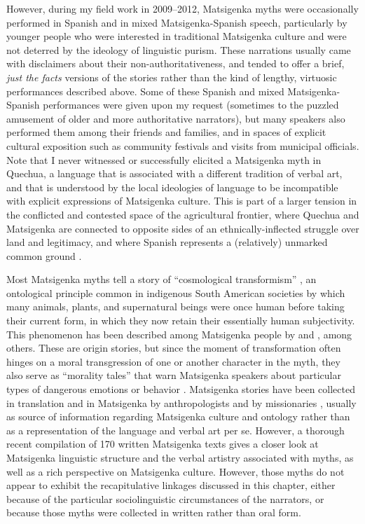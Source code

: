 \documentclass[output=paper]{LSP/langsci}
\begin{document}
However, during my field work in 2009--2012, Matsigenka myths were occasionally performed in Spanish and in mixed Matsigenka-Spanish speech, particularly by younger people who were interested in traditional Matsigenka culture and were not deterred by the ideology of linguistic purism. These narrations usually came with disclaimers about their non-authoritativeness, and tended to offer a brief, \textit{just the facts} versions of the stories rather than the kind of lengthy, virtuosic performances described above. Some of these Spanish and mixed Matsigenka-Spanish performances were given upon my request (sometimes to the puzzled amusement of older and more authoritative narrators), but many speakers also performed them among their friends and families, and in spaces of explicit cultural exposition such as community festivals and visits from municipal officials. Note that I never witnessed or successfully elicited a Matsigenka myth in Quechua, a language that is associated with a different tradition of verbal art, and that is understood by the local ideologies of language to be incompatible with explicit expressions of Matsigenka culture. This is part of a larger tension in the conflicted and contested space of the agricultural frontier, where Quechua and Matsigenka are connected to opposite sides of an ethnically-inflected struggle over land and legitimacy, and where Spanish represents a (relatively) unmarked common ground \citep[see][]{emlen.2015,emlen.2017}.

Most Matsigenka myths tell a story of ``cosmological transformism'' \citep[][471]{castro98}, an ontological principle common in indigenous South American societies by which many animals, plants, and supernatural beings were once human before taking their current form, in which they now retain their essentially human subjectivity. This phenomenon has been described among Matsigenka people by \citet{rosengren06} and \citet{johnson03}, among others. These are origin stories, but since the moment of transformation often hinges on a moral transgression of one or another character in the myth, they also serve as ``morality tales'' \citep[][118--124,220]{johnson03}  that warn Matsigenka speakers about particular types of dangerous emotions or behavior \citep{izquierdo07,johnson99,rosengren00, shepard02}. Matsigenka stories have been collected in translation and in Matsigenka by anthropologists \citep[e.g.][]{baer94,renard04, renard91} and by missionaries \citep[e.g.][]{cenitayoga44,davis99}, usually as source of information regarding Matsigenka culture and ontology rather than as a representation of the language and verbal art per se. However, a thorough recent compilation of 170 written Matsigenka texts \citep{vargas13} gives a closer look at Matsigenka linguistic structure and the verbal artistry associated with myths, as well as a rich perspective on Matsigenka culture. However, those myths do not appear to exhibit the recapitulative linkages discussed in this chapter, either because of the particular sociolinguistic circumstances of the narrators, or because those myths were collected in written rather than oral form.
\end{document}
